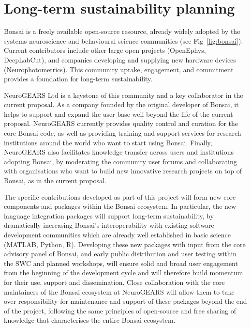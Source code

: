 
\section{Long-term sustainability planning}

Bonsai is a freely available open-source resource, already widely adopted by
the systems neuroscience and behavioural science communities (see Fig~\ref{fig:bonsai}).  
%
Current contributors include other large open projects (OpenEphys, DeepLabCut),
and companies developing and supplying new hardware devices  (Neurophotometrics).
%
This community uptake, engagement, and commitment provides a foundation for
long-term sustainability.

NeuroGEARS Ltd is a keystone of this community and a key collaborator in the current proposal.
As a company founded by the original developer of Bonsai, it helps to support and expand the
user base well beyond the life of the current proposal. NeuroGEARS currently provides
quality control and curation for the core Bonsai code, as well as providing training and support
services for research institutions around the world who want to start using Bonsai.
Finally, NeuroGEARS also facilitates knowledge transfer across users and institutions adopting
Bonsai, by moderating the community user forums and collaborating with organisations
who want to build new innovative research projects on top of Bonsai, as in the
current proposal.

The specific contributions developed as part of this project will form new core
components and packages within the Bonsai ecosystem. In particular, the new language integration packages will support long-term sustainability, by dramatically
increasing Bonsai's interoperability with existing software development communities which are
already well established in basic science (MATLAB, Python, R).
%
Developing these new packages with input from the core advisory panel of Bonsai,
and early public distribution and user testing within the SWC and planned workshops, will ensure
solid and broad user engagement from the beginning of the development cycle and will therefore
build momentum for their use, support and dissemination.
%
Close collaboration with the core maintainers of the Bonsai ecosystem at NeuroGEARS will
allow them to take over responsibility for maintenance and support of these packages beyond the
end of the project, following the same principles of open-source and free sharing of knowledge
that characterises the entire Bonsai ecosystem.


